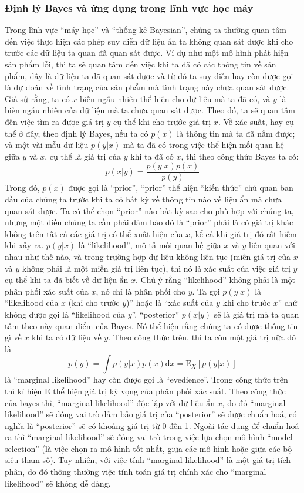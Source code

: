         \subsubsection{Định lý Bayes và ứng dụng trong lĩnh vực học máy}
        Trong lĩnh vực ``máy học'' và ``thống kê Bayesian'', chúng ta thường quan tâm đến việc thực hiện các phép suy diễn dữ liệu ẩn ta không quan sát được khi cho trước các dữ liệu ta quan đã quan sát được. Ví dụ như một mô hình phát hiện sản phẩm lỗi, thì ta sẽ quan tâm đến việc khi ta đã có các thông tin về sản phẩm, đây là dữ liệu ta đã quan sát được và từ đó ta suy diễn hay còn được gọi là dự đoán về tình trạng của sản phẩm mà tình trạng này chưa quan sát được. Giả sử rằng, ta có $x$ biến ngẫu nhiên thể hiện cho dữ liệu mà ta đã có, và $y$ là biến ngẫu nhiên của dữ liệu mà ta chưa quan sát được. Theo đó, ta sẽ quan tâm đến việc tìm ra được giá trị $y$ cụ thể khi cho trước giá trị $x$. Về xác suất, hay cụ thể ở đây, theo định lý Bayes, nếu ta có $p(x)$ là thông tin mà ta đã nắm được; và một vài mẫu dữ liệu $p(y|x)$ mà ta đã có trong việc thể hiện mối quan hệ giữa $y$ và $x$, cụ thể là giá trị của $y$ khi ta đã có $x$, thì theo công thức Bayes ta có: $$p(x|y) = \frac{p(y|x)p(x)}{p(y)}$$
        Trong đó, $p(x)$ được gọi là ``prior'', ``prior'' thể hiện ``kiến thức'' chủ quan ban đầu của chúng ta trước khi ta có bất kỳ về thông tin nào về liệu ẩn mà chưa quan sát được.
        Ta có thể chọn ``prior'' nào bất kỳ sao cho phù hợp với chúng ta, nhưng một điều chúng ta cần phải đảm bảo đó là ``prior'' phải là có giá trị khác không trên tất cả các giá trị có thể xuất hiện của $x$, kể cả khi giá trị đó rất hiếm khi xảy ra.
        $p(y|x)$ là ``likelihood'', mô tả mối quan hệ giữa $x$ và $y$ liên quan với nhau như thế nào, và trong trường hợp dữ liệu không liên tục (miền giá trị của $x$ và $y$ không phải là một miền giá trị liên tục), thì nó là xác suất của việc giá trị $y$ cụ thể khi ta đã biết về dữ liệu ẩn $x$. Chú ý rằng ``likelihood'' không phải là một phân phối xác suất của $x$, nó chỉ là phân phối cho $y$. Ta gọi $p(y|x)$ là ``likelihood của $x$ (khi cho trước $y$)'' hoặc là ``xác suất của $y$ khi cho trước $x$'' chứ không được gọi là ``likelihood của $y$''\cite{MacKay2003}.
        ``posterior'' $p(x|y)$ sẽ là giá trị mà ta quan tâm theo này quan điểm của Bayes. Nó thể hiện rằng chúng ta có được thông tin gì về $x$ khi ta có dữ liệu về $y$.
        Theo công thức trên, thì ta còn một giá trị nữa đó là $$p(y) = \int {p(y|x)p(x)\text{d}x = \mathrm{E}_X[p(y|x)]}$$ là ``marginal likelihood'' hay còn được gọi là ``evedience''. Trong công thức trên thì kí hiệu $\mathrm{E}$ thể hiện giá trị kỳ vọng của phân phối xác suất. Theo công thức của bayes thì, ``marginal likelihood'' độc lập với dữ liệu ẩn $x$, do đó ``marginal likelihood'' sẽ đóng vai trò đảm bảo giá trị của ``posterior'' sẽ được chuẩn hoá, có nghĩa là ``posterior'' sẽ có khoảng giá trị từ 0 đến 1. Ngoài tác dụng để chuẩn hoá ra thì ``marginal likelihood'' sẽ đóng vai trò trong việc lựa chọn mô hình ``model selection'' (là việc chọn ra mô hình tốt nhất, giữa các mô hình hoặc giữa các bộ siêu tham số). Tuy nhiên, với việc tính ``marginal likelihood'' là một giá trị tích phân, do đó thông thường việc tính toán giá trị chính xác cho ``marginal likelihood'' sẽ không dễ dàng. 

